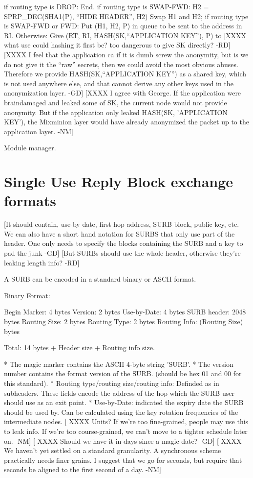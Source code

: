 	if routing type is DROP:
                End.
	if routing type is SWAP-FWD:
		H2 = SPRP_DEC(SHA1(P), ``HIDE HEADER'', H2)
		Swap H1 and H2;
        if routing type is SWAP-FWD or FWD:
	   	Put (H1, H2, P) in queue to be sent to the address in RI.
        Otherwise:
		Give (RT, RI, HASH(SK,``APPLICATION KEY''), P) to
[XXXX what use could hashing it first be? too dangerous to give SK
  directly? -RD]
[XXXX I feel that the application ca if it is dumb screw the
                anonymity, but is we do not give it the ``raw''
                secrets, then we could avoid the most obvious
                abuses. Therefore we provide HASH(SK,``APPLICATION
                KEY'') as a shared key, which is not used anywhere
                else, and that cannot derive any other keys used in
                the anonymization layer. -GD] 
[XXXX I agree with George.  If the application were braindamaged and
      leaked some of SK, the current node would not provide
      anonymity.  But if the application only leaked HASH(SK,
      'APPLICATION KEY'), the Mixminion layer would have already
      anonymized the packet up to the application layer. -NM]
		
Module manager. 

\section{Single Use Reply Block exchange formats}

[It should contain, use-by date, first hop address, 
 SURB block, public key, etc.
 We can also have a short hand notation for SURBS that only
 use part of the header. One only needs to specify the 
 blocks containing the SURB and a key to pad the junk -GD]
 [But SURBs should use the whole header, otherwise they're
  leaking length info? -RD]


A SURB can be encoded in a standard binary or ASCII format.

Binary Format:

   Begin Marker: 4 bytes
   Version:      2 bytes
   Use-by-Date:  4 bytes
   SURB header:  2048 bytes
   Routing Size: 2 bytes
   Routing Type: 2 bytes
   Routing Info: (Routing Size) bytes

   Total: 14 bytes + Header size + Routing info size.

* The magic marker contains the ASCII 4-byte string 'SURB'. 
* The version number contains the format version of the SURB.
  (should be hex 01 and 00 for this standard).
* Routing type/routing size/routing info: Definded as in subheaders.  
  These fields encode the address of the hop which the SURB user should
  use as an exit point.
* Use-by-Date: indicated the expiry date the SURB should be used by. Can
  be calculated using the key rotation frequencies of the intermediate
  nodes.
   [ XXXX Units? If we're too fine-grained, people may use this to
     leak info.  If we're too course-grained, we can't move to a
     tighter schedule later on.  -NM]
   [ XXXX Should we have it in days since a magic date? -GD]
   [ XXXX We haven't yet settled on a standard granularity.  A
      synchronous scheme practically needs finer grains.  I suggest
      that we go for seconds, but require that seconds be aligned to
      the first second of a day. -NM]
  
